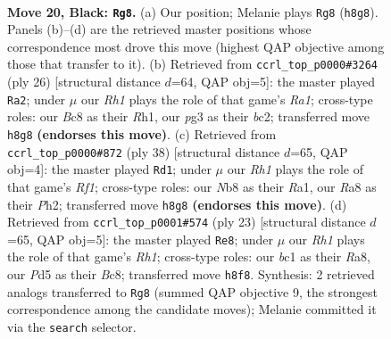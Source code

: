 \documentclass[11pt]{article}
\begin{document}
\clearpage

\begin{figure}[p]\centering
\begin{subfigure}{0.46\textwidth}\centering
\resizebox{\linewidth}{!}{%
\newchessgame
\chessboard[
  setfen={rnb1k2r/pp2b1pp/8/3pPp1P/8/6P1/P2NN3/R1B1K2R b KQ - 0 20},
  showmover=false,
  pgfstyle=straightmove, color=movearrow, markmove={h8-g8}
]}
\caption{}
\end{subfigure}\hfill
\begin{subfigure}{0.46\textwidth}\centering
\resizebox{\linewidth}{!}{%
\newchessgame
\chessboard[
  setfen={rn2k2r/ppp2ppp/3p4/8/3P4/P1P1BP2/2b3PP/R3KB1R w KQkq - 0 14},
  showmover=false,
  pgfstyle=straightmove, color=movearrow, markmove={a1-a2}
]}
\caption{}
\end{subfigure}
\\[4pt]
\begin{subfigure}{0.46\textwidth}\centering
\resizebox{\linewidth}{!}{%
\newchessgame
\chessboard[
  setfen={4k2r/p2nbppp/1n6/8/4p3/6P1/PP2PP1P/R1B2RK1 w k - 0 20},
  showmover=false,
  pgfstyle=straightmove, color=movearrow, markmove={f1-d1}
]}
\caption{}
\end{subfigure}\hfill
\begin{subfigure}{0.46\textwidth}\centering
\resizebox{\linewidth}{!}{%
\newchessgame
\chessboard[
  setfen={r1bk3r/ppp3pp/5p1n/4n3/P3PN2/8/BPPN2PP/R3K2R b KQ - 2 12},
  showmover=false,
  pgfstyle=straightmove, color=movearrow, markmove={h8-e8}
]}
\caption{}
\end{subfigure}
\caption{\textbf{Move 20, Black: \texttt{Rg8}.} (a) Our position; Melanie plays \texttt{Rg8} (\texttt{h8g8}). Panels (b)--(d) are the retrieved master positions whose correspondence most drove this move (highest QAP objective among those that transfer to it). (b) Retrieved from \texttt{ccrl\_top\_p0000\#3264} (ply 26) [structural distance $d$=64, QAP obj=5]: the master played \texttt{Ra2}; under $\mu$ our \emph{Rh1} plays the role of that game's \emph{Ra1}; cross-type roles: our \emph{B}c8 as their \emph{R}h1, our \emph{p}g3 as their \emph{b}c2; transferred move \texttt{h8g8} \textbf{(endorses this move)}. (c) Retrieved from \texttt{ccrl\_top\_p0000\#872} (ply 38) [structural distance $d$=65, QAP obj=4]: the master played \texttt{Rd1}; under $\mu$ our \emph{Rh1} plays the role of that game's \emph{Rf1}; cross-type roles: our \emph{N}b8 as their \emph{R}a1, our \emph{R}a8 as their \emph{P}h2; transferred move \texttt{h8g8} \textbf{(endorses this move)}. (d) Retrieved from \texttt{ccrl\_top\_p0001\#574} (ply 23) [structural distance $d$=65, QAP obj=5]: the master played \texttt{Re8}; under $\mu$ our \emph{Rh1} plays the role of that game's \emph{Rh1}; cross-type roles: our \emph{b}c1 as their \emph{R}a8, our \emph{P}d5 as their \emph{B}c8; transferred move \texttt{h8f8}. Synthesis: 2 retrieved analogs transferred to \texttt{Rg8} (summed QAP objective 9, the strongest correspondence among the candidate moves); Melanie committed it via the \texttt{search} selector.}
\label{fig:thought-m39}
\end{figure}
\end{document}
